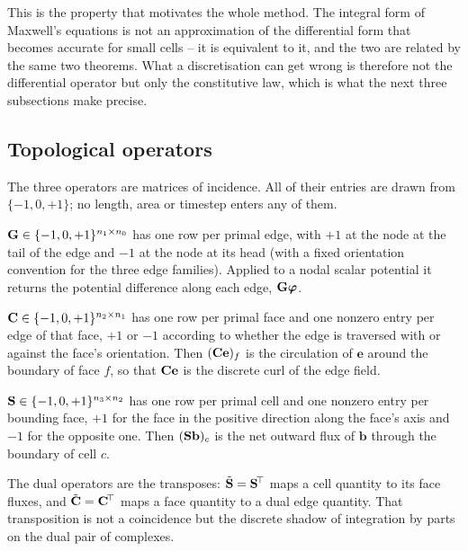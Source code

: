 This is the property that motivates the whole method. The integral form of Maxwell's equations is not an
approximation of the differential form that becomes accurate for small cells -- it is equivalent to it, and the
two are related by the same two theorems. What a discretisation can get wrong is therefore not the differential
operator but only the constitutive law, which is what the next three subsections make precise.

\subsection{Topological operators}

The three operators are matrices of incidence. All of their entries are drawn from $\{-1,0,+1\}$; no length, area
or timestep enters any of them.

\begin{definition}[Gradient]
$\mathbf{G}\in\{-1,0,+1\}^{n_1\times n_0}$ has one row per primal edge, with $+1$ at the node at the tail of the edge
and $-1$ at the node at its head (with a fixed orientation convention for the three edge families). Applied to a
nodal scalar potential it returns the potential difference along each edge, $\mathbf{G}\boldsymbol\varphi$.
\end{definition}

\begin{definition}[Curl]
$\mathbf{C}\in\{-1,0,+1\}^{n_2\times n_1}$ has one row per primal face and one nonzero entry per edge of that face,
$+1$ or $-1$ according to whether the edge is traversed with or against the face's orientation. Then
$(\mathbf{C}\mathbf{e})_f$ is the circulation of $\mathbf{e}$ around the boundary of face $f$, so that $\mathbf{C}\mathbf{e}$
is the discrete curl of the edge field.
\end{definition}

\begin{definition}[Divergence]
$\mathbf{S}\in\{-1,0,+1\}^{n_3\times n_2}$ has one row per primal cell and one nonzero entry per bounding face, $+1$
for the face in the positive direction along the face's axis and $-1$ for the opposite one. Then
$(\mathbf{S}\mathbf{b})_c$ is the net outward flux of $\mathbf{b}$ through the boundary of cell $c$.
\end{definition}

The dual operators are the transposes: $\tilde{\mathbf{S}} = \mathbf{S}^{\!\top}$ maps a cell quantity to its face fluxes, and
$\tilde{\mathbf{C}} = \mathbf{C}^{\!\top}$ maps a face quantity to a dual edge quantity. That transposition is not a coincidence
but the discrete shadow of integration by parts on the dual pair of complexes.

